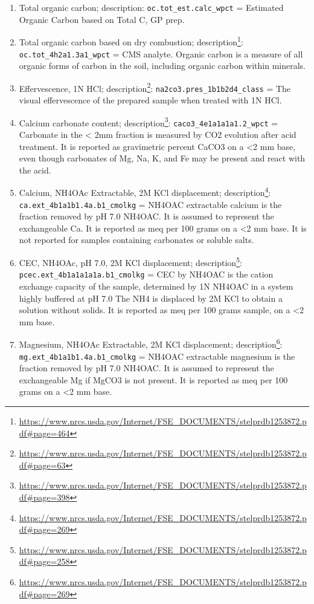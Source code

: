 \documentclass[
  graybox,natbib,nospthms]{svmono}
\renewcommand{\href}[2]{#2 (\url{#1})}
\renewcommand{\href}[2]{#2\footnote{\url{#1}}}
\begin{document}
\begin{enumerate}
\item
  Total organic carbon; description: \texttt{oc.tot\_est.calc\_wpct} = Estimated Organic Carbon based on Total C, GP prep.\\
\item
  Total organic carbon based on dry combustion; \href{https://www.nrcs.usda.gov/Internet/FSE_DOCUMENTS/stelprdb1253872.pdf\#page=464}{description}: \texttt{oc.tot\_4h2a1.3a1\_wpct} = CMS analyte. Organic carbon is a measure of all organic forms of carbon in the soil, including organic carbon within minerals.
\item
  Effervescence, 1N HCl; \href{https://www.nrcs.usda.gov/Internet/FSE_DOCUMENTS/stelprdb1253872.pdf\#page=63}{description}: \texttt{na2co3.pres\_1b1b2d4\_class} = The visual effervescence of the prepared sample when treated with 1N HCl.\\
\item
  Calcium carbonate content; \href{https://www.nrcs.usda.gov/Internet/FSE_DOCUMENTS/stelprdb1253872.pdf\#page=398}{description}: \texttt{caco3\_4e1a1a1a1.2\_wpct} = Carbonate in the \textless{} 2mm fraction is measured by CO2 evolution after acid treatment. It is reported as gravimetric percent CaCO3 on a \textless2 mm base, even though carbonates of Mg, Na, K, and Fe may be present and react with the acid.\\
\item
  Calcium, NH4OAc Extractable, 2M KCl displacement; \href{https://www.nrcs.usda.gov/Internet/FSE_DOCUMENTS/stelprdb1253872.pdf\#page=269}{description}: \texttt{ca.ext\_4b1a1b1.4a.b1\_cmolkg} = NH4OAC extractable calcium is the fraction removed by pH 7.0 NH4OAC. It is assumed to represent the exchangeable Ca. It is reported as meq per 100 grams on a \textless2 mm base. It is not reported for samples containing carbonates or soluble salts.\\
\item
  CEC, NH4OAc, pH 7.0, 2M KCl displacement; \href{https://www.nrcs.usda.gov/Internet/FSE_DOCUMENTS/stelprdb1253872.pdf\#page=258}{description}: \texttt{pcec.ext\_4b1a1a1a1a.b1\_cmolkg} = CEC by NH4OAC is the cation exchange capacity of the sample, determined by 1N NH4OAC in a system highly buffered at pH 7.0 The NH4 is displaced by 2M KCl to obtain a solution without solids. It is reported as meq per 100 grams sample, on a \textless2 mm base.\\
\item
  Magnesium, NH4OAc Extractable, 2M KCl displacement; \href{https://www.nrcs.usda.gov/Internet/FSE_DOCUMENTS/stelprdb1253872.pdf\#page=269}{description}: \texttt{mg.ext\_4b1a1b1.4a.b1\_cmolkg} = NH4OAC extractable magnesium is the fraction removed by pH 7.0 NH4OAC. It is assumed to represent the exchangeable Mg if MgCO3 is not present. It is reported as meq per 100 grams on a \textless2 mm base.\\

\end{enumerate}
\end{document}
